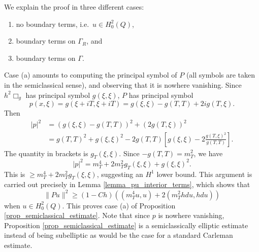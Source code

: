 \documentclass[11pt,letterpaper]{amsart}
\theoremstyle{definition}
\numberwithin{equation}{section}
\newcommand{\norm}[1]{\lVert #1 \rVert}         %
\begin{document}
We explain the proof in three different cases:
\begin{enumerate}
\item[(a)] 
no boundary terms, i.e.\ $u \in H^2_0(Q)$,
\item[(b)]
boundary terms on $\Gamma_R$, and 
\item[(c)]
boundary terms on $\Gamma$.
\end{enumerate}

Case (a) amounts to computing the principal symbol of $P$ (all symbols are taken in the semiclassical sense), and observing that it is nowhere vanishing. Since $h^2 \Box_g$ has principal symbol $g(\xi, \xi)$, $P$ has principal symbol 
\[
p(x,\xi) = g(\xi + i T, \xi + i T) = g(\xi, \xi) - g(T, T) + 2i g(T, \xi).
\]
Then 
\begin{align*}
|p|^2 &= (g(\xi,\xi) - g(T,T))^2 + (2 g(T, \xi))^2 \\
 &= g(T,T)^2 + g(\xi,\xi)^2 - 2 g(T,T) \left[ g(\xi, \xi) - 2 \frac{g(T,\xi)^2}{g(T,T)} \right].
\end{align*}
The quantity in brackets is $g_T(\xi, \xi)$. Since $-g(T,T) = m_T^2$, we have 
\[
|p|^2 = m_T^4 + 2 m_T^2 g_T(\xi, \xi) + g(\xi, \xi)^2.
\]
This is $\geq m_T^4 + 2 m_T^2 g_T(\xi, \xi)$, suggesting an $H^1$ lower bound. This argument is carried out precisely in Lemma \ref{lemma_pu_interior_terms}, which shows that 
\[
\norm{Pu}^2 \geq  (1-Ch)((m_T^4 u, u) + 2 (m_T^2 hdu, hdu))
\]
when $u \in H^2_0(Q)$. This proves case (a) of Proposition \ref{prop_semiclassical_estimate}. Note that since $p$ is nowhere vanishing, Proposition \ref{prop_semiclassical_estimate} is a semiclassically elliptic estimate instead of being subelliptic as would be the case for a standard Carleman estimate.
\end{document}
